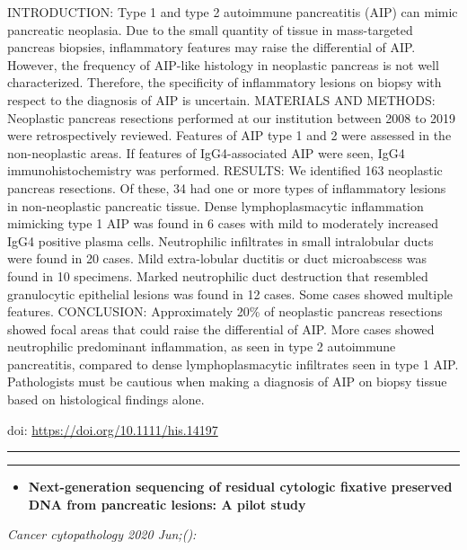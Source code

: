 \documentclass[
]{article}
\providecommand{\tightlist}{%
  \setlength{\itemsep}{0pt}\setlength{\parskip}{0pt}}
\begin{document}
INTRODUCTION: Type 1 and type 2 autoimmune pancreatitis (AIP) can mimic
pancreatic neoplasia. Due to the small quantity of tissue in
mass-targeted pancreas biopsies, inflammatory features may raise the
differential of AIP. However, the frequency of AIP-like histology in
neoplastic pancreas is not well characterized. Therefore, the
specificity of inflammatory lesions on biopsy with respect to the
diagnosis of AIP is uncertain. MATERIALS AND METHODS: Neoplastic
pancreas resections performed at our institution between 2008 to 2019
were retrospectively reviewed. Features of AIP type 1 and 2 were
assessed in the non-neoplastic areas. If features of IgG4-associated AIP
were seen, IgG4 immunohistochemistry was performed. RESULTS: We
identified 163 neoplastic pancreas resections. Of these, 34 had one or
more types of inflammatory lesions in non-neoplastic pancreatic tissue.
Dense lymphoplasmacytic inflammation mimicking type 1 AIP was found in 6
cases with mild to moderately increased IgG4 positive plasma cells.
Neutrophilic infiltrates in small intralobular ducts were found in 20
cases. Mild extra-lobular ductitis or duct microabscess was found in 10
specimens. Marked neutrophilic duct destruction that resembled
granulocytic epithelial lesions was found in 12 cases. Some cases showed
multiple features. CONCLUSION: Approximately 20\% of neoplastic pancreas
resections showed focal areas that could raise the differential of AIP.
More cases showed neutrophilic predominant inflammation, as seen in type
2 autoimmune pancreatitis, compared to dense lymphoplasmacytic
infiltrates seen in type 1 AIP. Pathologists must be cautious when
making a diagnosis of AIP on biopsy tissue based on histological
findings alone.

doi: \url{https://doi.org/10.1111/his.14197}

\begin{center}\rule{0.5\linewidth}{0.5pt}\end{center}

\begin{center}\rule{0.5\linewidth}{0.5pt}\end{center}

\begin{itemize}
\tightlist
\item
  \textbf{Next-generation sequencing of residual cytologic fixative
  preserved DNA from pancreatic lesions: A pilot study}
\end{itemize}

\emph{Cancer cytopathology 2020 Jun;():}
\end{document}
